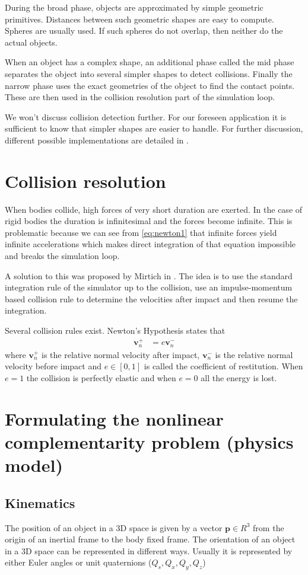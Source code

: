 During the broad phase, objects are approximated by simple geometric primitives. Distances between such geometric shapes are easy to compute. Spheres are usually used. If such spheres do not overlap, then neither do the actual objects.

When an object has a complex shape, an additional phase called the mid phase separates the object into several simpler shapes to detect collisions. Finally the narrow phase uses the exact geometries of the object to find the contact points. These are then used in the collision resolution part of the simulation loop.

We won't discuss collision detection further. For our foreseen application it is sufficient to know that simpler shapes are easier to handle. For further discussion, different possible implementations are detailed in \cite{jimenez20013d}.

\section{Collision resolution}
When bodies collide, high forces of very short duration are exerted. In the case of rigid bodies the duration is infinitesimal and the forces become infinite. This is problematic because we can see from \cref{eq:newton1} that infinite forces yield infinite accelerations which makes direct integration of that equation impossible and breaks the simulation loop.

A solution to this was proposed by Mirtich in \cite{mirtich1996impulse}. The idea is to use the standard integration rule of the simulator up to the collision, use an impulse-momentum based collision rule to determine the velocities after impact and then resume the integration.

Several collision rules exist. Newton's Hypothesis states that 
\begin{align*}
\mathbf{v}_n^+ &= e\mathbf{v}_n^-
\end{align*}
where $\mathbf{v}_n^+$ is the relative normal velocity after impact, $\mathbf{v}_n^-$ is the relative normal velocity before impact and $e \in [0, 1]$ is called the coefficient of restitution. When $e=1$ the collision is perfectly elastic and when $e=0$ all the energy is lost.

\section{Formulating the nonlinear complementarity problem (physics model)}
\subsection{Kinematics}
The position of an object in a 3D space is given by a vector $\mathbf{p} \in R^3$ from the origin of an inertial frame to the body fixed frame. The orientation of an object in a 3D space can be represented in different ways. Usually it is represented by either Euler angles or unit quaternions ($Q_s, Q_x, Q_y, Q_z$)

